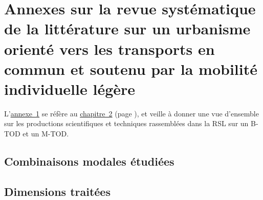     \setcounter{section}{0}
\chapter{Annexes sur la revue systématique de la littérature sur un urbanisme orienté vers les transports en commun et soutenu par la mobilité individuelle légère}
    \label{annexes:rsl}

L'\hyperref[annexes:rsl]{annexe~\ref{annexes:rsl}} se réfère au \hyperref[chap2:titre]{chapitre~2} (page \pageref{chap2:titre}), et veille à donner une vue d'ensemble sur les productions scientifiques et techniques rassemblées dans la \acrfull{RSL} sur un \acrfull{B-TOD} et un \acrfull{M-TOD}.%

    \setcounter{tocdepth}{2}
    \renewcommand{\localcontentsname}{Structure de l'annexe~\ref{annexes:rsl}}
\localtableofcontents

    \newpage
\section{Combinaisons modales étudiées}
    \label{annexes:rsl-combinaisons-modales}



\section{Dimensions traitées}
    \label{annexes:rsl-resultats}

